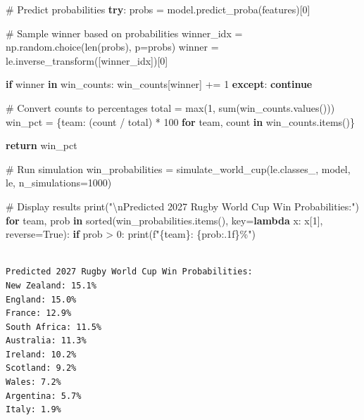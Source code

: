 \documentclass[
  letterpaper,
  DIV=11,
  numbers=noendperiod]{scrartcl}
\newenvironment{Shaded}{\begin{snugshade}}{\end{snugshade}}
\newcommand{\BuiltInTok}[1]{\textcolor[rgb]{0.00,0.23,0.31}{#1}}
\newcommand{\CharTok}[1]{\textcolor[rgb]{0.13,0.47,0.30}{#1}}
\newcommand{\CommentTok}[1]{\textcolor[rgb]{0.37,0.37,0.37}{#1}}
\newcommand{\ControlFlowTok}[1]{\textcolor[rgb]{0.00,0.23,0.31}{\textbf{#1}}}
\newcommand{\DecValTok}[1]{\textcolor[rgb]{0.68,0.00,0.00}{#1}}
\newcommand{\KeywordTok}[1]{\textcolor[rgb]{0.00,0.23,0.31}{\textbf{#1}}}
\newcommand{\NormalTok}[1]{\textcolor[rgb]{0.00,0.23,0.31}{#1}}
\newcommand{\OperatorTok}[1]{\textcolor[rgb]{0.37,0.37,0.37}{#1}}
\newcommand{\SpecialCharTok}[1]{\textcolor[rgb]{0.37,0.37,0.37}{#1}}
\newcommand{\SpecialStringTok}[1]{\textcolor[rgb]{0.13,0.47,0.30}{#1}}
\newcommand{\StringTok}[1]{\textcolor[rgb]{0.13,0.47,0.30}{#1}}
\newcommand{\VariableTok}[1]{\textcolor[rgb]{0.07,0.07,0.07}{#1}}
\begin{document}
\begin{Shaded}
\begin{Highlighting}[]
        \CommentTok{\# Predict probabilities}
        \ControlFlowTok{try}\NormalTok{:}
\NormalTok{            probs }\OperatorTok{=}\NormalTok{ model.predict\_proba(features)[}\DecValTok{0}\NormalTok{]}
            
            \CommentTok{\# Sample winner based on probabilities}
\NormalTok{            winner\_idx }\OperatorTok{=}\NormalTok{ np.random.choice(}\BuiltInTok{len}\NormalTok{(probs), p}\OperatorTok{=}\NormalTok{probs)}
\NormalTok{            winner }\OperatorTok{=}\NormalTok{ le.inverse\_transform([winner\_idx])[}\DecValTok{0}\NormalTok{]}
            
            \ControlFlowTok{if}\NormalTok{ winner }\KeywordTok{in}\NormalTok{ win\_counts:}
\NormalTok{                win\_counts[winner] }\OperatorTok{+=} \DecValTok{1}
        \ControlFlowTok{except}\NormalTok{:}
            \ControlFlowTok{continue}
    
    \CommentTok{\# Convert counts to percentages}
\NormalTok{    total }\OperatorTok{=} \BuiltInTok{max}\NormalTok{(}\DecValTok{1}\NormalTok{, }\BuiltInTok{sum}\NormalTok{(win\_counts.values()))}
\NormalTok{    win\_pct }\OperatorTok{=}\NormalTok{ \{team: (count }\OperatorTok{/}\NormalTok{ total) }\OperatorTok{*} \DecValTok{100} \ControlFlowTok{for}\NormalTok{ team, count }\KeywordTok{in}\NormalTok{ win\_counts.items()\}}
    
    \ControlFlowTok{return}\NormalTok{ win\_pct}

\CommentTok{\# Run simulation}
\NormalTok{win\_probabilities }\OperatorTok{=}\NormalTok{ simulate\_world\_cup(le.classes\_, model, le, n\_simulations}\OperatorTok{=}\DecValTok{1000}\NormalTok{)}

\CommentTok{\# Display results}
\BuiltInTok{print}\NormalTok{(}\StringTok{"}\CharTok{\textbackslash{}n}\StringTok{Predicted 2027 Rugby World Cup Win Probabilities:"}\NormalTok{)}
\ControlFlowTok{for}\NormalTok{ team, prob }\KeywordTok{in} \BuiltInTok{sorted}\NormalTok{(win\_probabilities.items(), key}\OperatorTok{=}\KeywordTok{lambda}\NormalTok{ x: x[}\DecValTok{1}\NormalTok{], reverse}\OperatorTok{=}\VariableTok{True}\NormalTok{):}
    \ControlFlowTok{if}\NormalTok{ prob }\OperatorTok{\textgreater{}} \DecValTok{0}\NormalTok{:}
        \BuiltInTok{print}\NormalTok{(}\SpecialStringTok{f"}\SpecialCharTok{\{}\NormalTok{team}\SpecialCharTok{\}}\SpecialStringTok{: }\SpecialCharTok{\{}\NormalTok{prob}\SpecialCharTok{:.1f\}}\SpecialStringTok{\%"}\NormalTok{)}
\end{Highlighting}
\end{Shaded}

\begin{verbatim}

Predicted 2027 Rugby World Cup Win Probabilities:
New Zealand: 15.1%
England: 15.0%
France: 12.9%
South Africa: 11.5%
Australia: 11.3%
Ireland: 10.2%
Scotland: 9.2%
Wales: 7.2%
Argentina: 5.7%
Italy: 1.9%
\end{verbatim}
\end{document}
